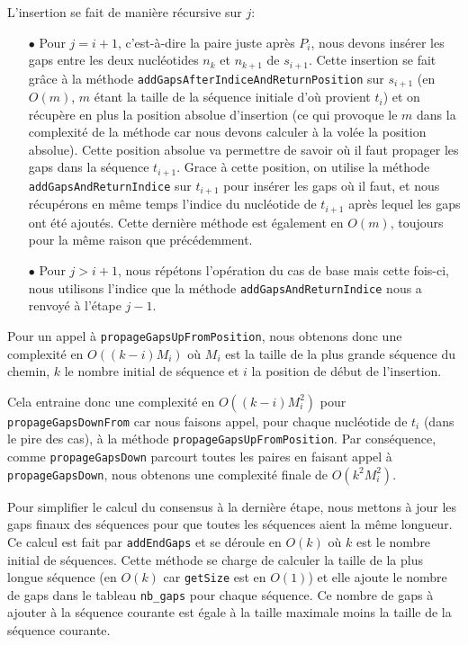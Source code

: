 L'insertion se fait de manière récursive sur $j$:
\begin{itemize}
	\item[$\bullet$] Pour $j = i + 1$, c'est-à-dire la paire juste après $P_{i}$, nous
		devons insérer les gaps entre les deux nucléotides $n_{k}$ et $n_{k +
		1}$ de $s_{i + 1}$. Cette insertion se fait grâce à la méthode
		\verb|addGapsAfterIndiceAndReturnPosition| sur $s_{i + 1}$ (en $O(m)$,
		$m$ étant la taille de la séquence initiale d'où provient $t_{i}$) et on
		récupère en plus la position absolue d'insertion (ce qui provoque le $m$
		dans la complexité de la méthode car nous devons calculer à la volée la
		position absolue). Cette position absolue va permettre de savoir où il
		faut propager les gaps dans la séquence $t_{i + 1}$. Grace à cette
		position, on utilise la méthode \verb|addGapsAndReturnIndice| sur $t_{i
		+ 1}$ pour insérer les gaps où il faut, et nous récupérons en même temps
		l'indice du nucléotide de $t_{i + 1}$ après lequel les gaps ont été
		ajoutés. Cette dernière méthode est également en $O(m)$, toujours pour
		la même raison que précédemment.
	\item[$\bullet$] Pour $j > i + 1$, nous répétons l'opération du cas de base mais cette
		fois-ci, nous utilisons l'indice que la méthode
		\verb|addGapsAndReturnIndice| nous a renvoyé à l'étape $j - 1$.
\end{itemize}

Pour un appel à \verb|propageGapsUpFromPosition|, nous obtenons donc une
complexité en $O( (k - i) M_{i})$ où $M_{i}$ est la taille de la plus grande
séquence du chemin, $k$ le nombre initial de séquence et $i$ la position de
début de l'insertion.

Cela entraine donc une complexité en $O( (k - i) M_{i}^{2})$ pour
\verb|propageGapsDownFrom| car nous faisons appel, pour chaque nucléotide de
$t_{i}$ (dans le pire des cas), à la méthode \-\verb|propageGapsUpFromPosition|.
Par conséquence, comme \verb|propageGapsDown| parcourt toutes les paires en
faisant appel à \verb|propageGapsDown|, nous obtenons une complexité finale de
$O(k^{2} M_{i}^{2})$.

Pour simplifier le calcul du consensus à la dernière étape, nous mettons à jour
les gaps finaux des séquences pour que toutes les séquences aient la même
longueur. Ce calcul est fait par \verb|addEndGaps| et se déroule en $O(k)$ où
$k$ est le nombre initial de séquences. Cette méthode se charge de calculer la
taille de la plus longue séquence (en $O(k)$ car \verb|getSize| est en $O(1)$)
et elle ajoute le nombre de gaps dans le tableau \verb|nb_gaps| pour chaque
séquence. Ce nombre de gaps à ajouter à la séquence courante est égale à la
taille maximale moins la taille de la séquence courante.

